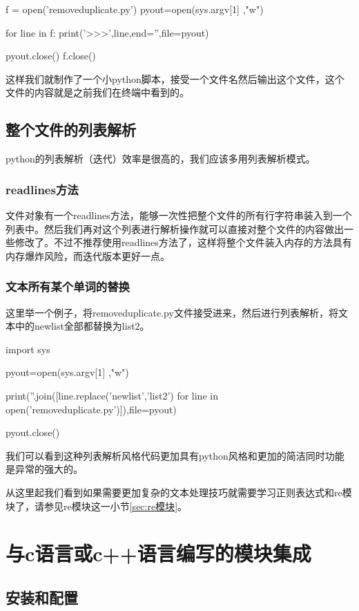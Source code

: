 \documentclass[12pt,oneside]{book}
\begin{document}
\begin{common-format}
\begin{tcbpython}
f = open('removeduplicate.py')
pyout=open(sys.argv[1] ,"w")

for line in f:
    print('>>>',line,end='',file=pyout)

pyout.close()
f.close()
\end{tcbpython}
这样我们就制作了一个小python脚本，接受一个文件名然后输出这个文件，这个文件的内容就是之前我们在终端中看到的。

\section{整个文件的列表解析}
python的列表解析（迭代）效率是很高的，我们应该多用列表解析模式。

\subsection{readlines方法}
文件对象有一个readlines方法，能够一次性把整个文件的所有行字符串装入到一个列表中。然后我们再对这个列表进行解析操作就可以直接对整个文件的内容做出一些修改了。不过不推荐使用readlines方法了，这样将整个文件装入内存的方法具有内存爆炸风险，而迭代版本更好一点。

\subsection{文本所有某个单词的替换}
这里举一个例子，将removeduplicate.py文件接受进来，然后进行列表解析，将文本中的newlist全部都替换为list2。

\begin{tcbpython}
import sys

pyout=open(sys.argv[1] ,"w")

print(''.join([line.replace('newlist','list2') 
for line in open('removeduplicate.py')]),file=pyout)

pyout.close()
\end{tcbpython}

我们可以看到这种列表解析风格代码更加具有python风格和更加的简洁同时功能是异常的强大的。

从这里起我们看到如果需要更加复杂的文本处理技巧就需要学习正则表达式和re模块了，请参见re模块这一小节\ref{sec:re模块}。





\chapter{与c语言或c++语言编写的模块集成}
\section{安装和配置}

\end{common-format}
\end{document}
